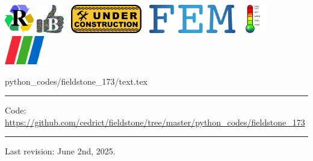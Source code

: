 \noindent
\includegraphics[height=1.25cm]{images/pictograms/replication}
\includegraphics[height=1.25cm]{images/pictograms/benchmark}
\includegraphics[height=1.25cm]{images/pictograms/under_construction}
\includegraphics[height=1.25cm]{images/pictograms/FEM}
\includegraphics[height=1.25cm]{images/pictograms/temperature}
\includegraphics[height=1.25cm]{images/pictograms/paraview}


\begin{flushright} {\tiny {\color{gray} python\_codes/fieldstone\_173/text.tex}} \end{flushright}

%

\par\noindent\rule{\textwidth}{0.4pt}

\begin{center}
\inpython
{\small Code: \url{https://github.com/cedrict/fieldstone/tree/master/python_codes/fieldstone_173}}
\end{center}

\par\noindent\rule{\textwidth}{0.4pt}

Last revision: June 2nd, 2025.


